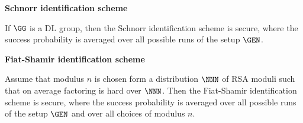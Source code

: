 \documentclass[landscape,footrule]{foils}
\begin{document}

\textbf{Schnorr identification scheme}

If $\GG$ is a DL group, then the Schnorr identification scheme is
secure, where the success probability is averaged over all possible
runs of the setup $\GEN$.

\vskip 2cm
\textbf{Fiat-Shamir identification scheme}

Assume that modulus $n$ is chosen form a distribution $\NNN$ of RSA
moduli such that on average factoring is hard over $\NNN$. Then the
Fiat-Shamir identification scheme is secure, where the success
probability is averaged over all possible runs of the setup $\GEN$ and
over all choices of modulus $n$.
\end{document}
